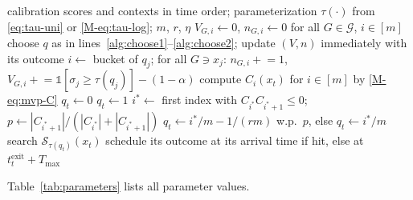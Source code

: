 \begin{algorithm}[!htbp]
\caption{MVP threshold calibration with delayed, partial feedback}
\label{alg:mvp}
\begin{algorithmic}[1]
\Require calibration scores and contexts in time order; parameterization
  $\tau(\cdot)$ from \eqref{eq:tau-uni} or \eqref{M-eq:tau-log}; $m$, $r$, $\eta$
\State $V_{G,i}\gets 0$, $n_{G,i}\gets 0$ for all $G\in\mathcal{G}$, $i\in[m]$
 
  \State choose $q$ as in lines~\ref{alg:choose1}--\ref{alg:choose2};
  update $(V,n)$ immediately with its outcome
\EndFor
{}
    \State $i\gets$ bucket of $q_j$; for all $G\ni x_j$:
      $n_{G,i}\mathrel{+}=1$,
      $V_{G,i}\mathrel{+}=\mathbb{1}[\sigma_j\ge\tau(q_j)]-(1-\alpha)$
  \EndFor
  \State compute $C_i(x_t)$ for $i\in[m]$ by \eqref{M-eq:mvp-C} \label{alg:choose1}
   $q_t\gets 0$
   $q_t\gets 1$
  \Else
    \State $i^\ast\gets$ first index with $C_{i^\ast}C_{i^\ast+1}\le 0$;
      $p\gets|C_{i^\ast+1}|/(|C_{i^\ast}|+|C_{i^\ast+1}|)$
    \State $q_t\gets i^\ast/m-1/(rm)$ w.p.\ $p$, else $q_t\gets i^\ast/m$
      \label{alg:choose2}
  \EndIf
  \State search $\mathcal{S}_{\tau(q_t)}(x_t)$
    \State schedule its outcome at its arrival time if hit, else at
      $t^{\mathrm{exit}}_t+T_{\max}$
  \EndIf
\EndFor
\end{algorithmic}
\end{algorithm}

Table~\ref{tab:parameters} lists all parameter values.

\clearpage


